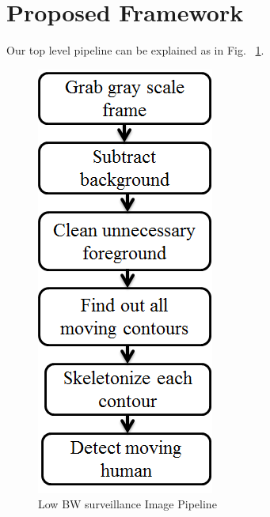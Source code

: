 \documentclass[conference]{IEEEtran}
\begin{document}
\section{Proposed Framework}
Our top level pipeline can be explained as in Fig. ~\ref{image_pipeline}.
\begin{figure}[!h]
\centering
\includegraphics[scale=0.45]{figures/image_pipeline}
\caption{Low BW surveillance Image Pipeline}
\label{image_pipeline}
\end{figure}
\end{document}
